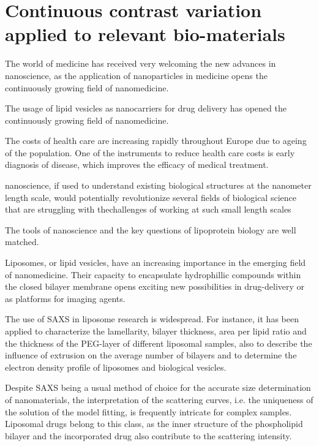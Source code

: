 \chapter{Continuous contrast variation applied to relevant bio-materials}
\label{chap:bio_applications}

The world of medicine has received very welcoming the new advances in nanoscience, as the application of nanoparticles in medicine opens the continuously growing field of nanomedicine. \cite{nie_nanotechnology_2007, sahoo_nanotech_2003, wickline_nanotechnology_2003, zhou_nano-enabled_2014, rosen_rise_2005}

The usage of lipid vesicles as nanocarriers for drug delivery has opened the continuously growing field of nanomedicine. 

The costs of health care are increasing rapidly throughout Europe due to ageing of the population. One of the instruments to reduce health care costs is early diagnosis of disease, which improves the efficacy of medical treatment.

nanoscience, if used to understand existing biological structures at the nanometer length scale, would potentially revolutionize several fields of biological science that are struggling with thechallenges of working at such small length scales

The tools of nanoscience and the key questions of lipoprotein biology are well matched. 






Liposomes, or lipid vesicles, have an increasing importance in the emerging field of nanomedicine. Their capacity to encapsulate hydrophillic compounds within the closed bilayer membrane opens exciting new possibilities in drug-delivery or as platforms for imaging agents.


The use of SAXS in liposome research is widespread. For instance, it has been applied to characterize the lamellarity, bilayer thickness, area per lipid ratio and the thickness of the PEG-layer of different liposomal samples, also to describe the influence of extrusion on the average number of bilayers and to determine the electron density profile of liposomes and biological vesicles.

Despite SAXS being a usual method of choice for the accurate size determination of nanomaterials, the interpretation of the scattering curves, i.e. the uniqueness of the solution of the model fitting, is frequently intricate for complex samples. Liposomal drugs belong to this class, as the inner structure of the phospholipid bilayer and the incorporated drug also contribute to the scattering intensity. 

